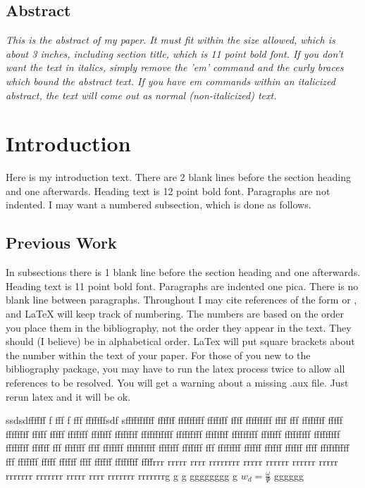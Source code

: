 \subsection*{\centering Abstract}
{\em
This is the abstract of my paper.  It must fit within the 
size allowed, which is about 3 inches, including section 
title, which is 11 point bold font.  If you don't want 
the text in italics, simply remove the 'em' command and 
the curly braces which bound the abstract text.  If you 
have em commands within an italicized abstract, the text 
will come out as normal (non-italicized) text. 
}

\section{Introduction}
Here is my introduction text.  There are 2 blank lines 
before the section heading and one afterwards.  Heading 
text is 12 point bold font.  Paragraphs are not indented. 
I may want a numbered subsection, which is done as 
follows.

\subsection{Previous Work}
In subsections there is 1 blank line before the section 
heading and one afterwards.  Heading text is 11 point 
bold font.  Paragraphs are indented one pica.  There is 
no blank line between paragraphs.
Throughout I may cite references of the form 
\cite{key:foo} or \cite{foo:baz}, and LaTeX will keep 
track of numbering.  The numbers are based on the order 
you place them in the bibliography, not the order they 
appear in the text.  They should (I believe) be in 
alphabetical order.  LaTex will put square brackets about 
the number within the text of your paper.  For those of 
you new to the bibliography package, you may have to run 
the latex process twice to allow all references to be 
resolved. You will get a warning about a missing .aux 
file.  Just rerun latex and it will be ok.

ssdsdffffff f fff f fff fffffffsdf sffffffffff ffffff fffffffff fffffff ffff fffffffff ffff fff ffffffff fffff ffffffff fffff fffff fffffff fffffff ffffffff fffffffffff fffffffff ffffffff fffffffff fffffff fffffffff fffffffff ffffffff ffffff fff fffffff ffff fffffff ffffffffff fffffff fffffff fff ffffffff ffffff ffffff ffffff ffff ffffffffff fff fffffff fffff ffffff ffff ffffff ffffffff ffffrrr rrrrr rrrr rrrrrrrr rrrrr rrrrrr rrrrrr rrrrr rrrrrrr rrrrrrr rrrrr rrrr rrrrrrr rrrrrrrg g g gggggggg g $w_d = \frac{\omega}{\Psi}$ gggggg


